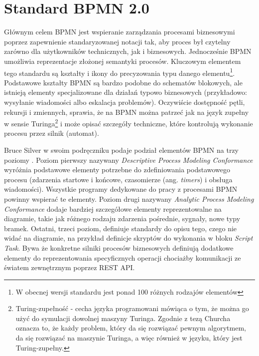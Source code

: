 \documentclass[declaration,shortabstract,mgr]{iithesis}
\newcommand{\bpmn}{BPMN }
\begin{document}
\chapter{Standard BPMN 2.0}\label{chapter-bpmn}
Głównym celem \bpmn jest wspieranie zarządzania procesami biznesowymi poprzez zapewnienie standaryzowanej notacji tak, aby proces był czytelny zarówno dla użytkowników technicznych, jak i biznesowych. Jednocześnie \bpmn umożliwia reprezentacje złożonej semantyki procesów. Kluczowym elementem tego standardu są kształty i ikony do precyzowania typu danego elementu\footnote{W obecnej wersji standardu jest ponad 100 różnych rodzajów elementów}. Podstawowe kształty \bpmn są bardzo podobne do schematów blokowych, ale istnieją elementy specjalizowane dla działań typowo biznesowych (przykładowo: wysyłanie wiadomości albo eskalacja problemów). Oczywiście dostępność pętli, rekursji i zmiennych, sprawia, że na \bpmn można patrzeć jak na język zupełny w sensie Turinga\footnote{Turing-zupełność - cecha języka programowani mówiąca o tym, że można go użyć do symulacji dowolnej maszyny Turinga. Zgodnie z tezą Churcha oznacza to, że każdy problem, który da się rozwiązać pewnym algorytmem, da się rozwiązać na maszynie Turinga, a więc również w języku, który jest Turing-zupełny.} i może opisać szczegóły techniczne, które kontrolują wykonanie procesu przez silnik (automat).  

Bruce Silver w swoim podręczniku podaje podział elementów \bpmn na trzy poziomy \cite{bruce-silver-bpmn-levels}. Poziom pierwszy nazywany \textit{Descriptive Process Modeling Conformance} wyróżnia podstawowe elementy potrzebne do zdefiniowania podstawowego procesu (zdarzenia startowe i końcowe, czasomierze (ang. \textit{timers}) i obsługa wiadomości). Wszystkie programy dedykowane do pracy z procesami \bpmn powinny wspierać te elementy. Poziom drugi nazywany \textit{Analytic Process Modeling Conformance} dodaje bardziej szczegółowe elementy reprezentowalne na diagramie, takie jak różnego rodzaju zdarzenia pośrednie, sygnały, nowe typy bramek. Ostatni, trzeci poziom, definiuje standardy do opisu tego, czego nie widać na diagramie, na przykład definicje skryptów do wykonania w bloku \textit{Script Task}. Bywa że konkretne silniki procesów biznesowych definiują dodatkowe elementy do reprezentowania specyficznych operacji chociażby komunikacji ze światem zewnętrznym poprzez REST API.
\end{document}
